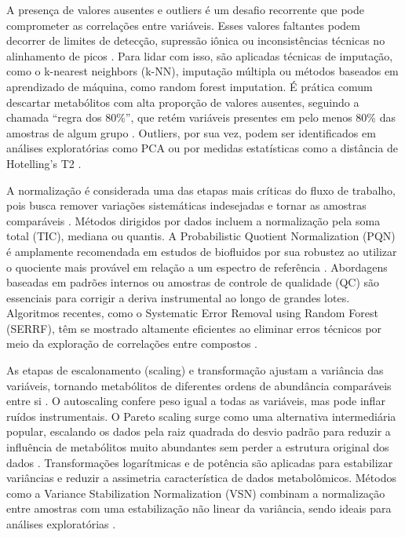 A presença de valores ausentes e outliers é um desafio recorrente que pode comprometer as correlações entre variáveis. Esses valores faltantes podem decorrer de limites de detecção, supressão iônica ou inconsistências técnicas no alinhamento de picos \cite{sun2024pretreating}. Para lidar com isso, são aplicadas técnicas de imputação, como o k-nearest neighbors (k-NN), imputação múltipla ou métodos baseados em aprendizado de máquina, como random forest imputation. É prática comum descartar metabólitos com alta proporção de valores ausentes, seguindo a chamada “regra dos 80\%”, que retém variáveis presentes em pelo menos 80\% das amostras de algum grupo \cite{sun2024pretreating}. Outliers, por sua vez, podem ser identificados em análises exploratórias como PCA ou por medidas estatísticas como a distância de Hotelling’s T2 \cite{schiffman2018data}.

A normalização é considerada uma das etapas mais críticas do fluxo de trabalho, pois busca remover variações sistemáticas indesejadas e tornar as amostras comparáveis \cite{sun2024pretreating}. Métodos dirigidos por dados incluem a normalização pela soma total (TIC), mediana ou quantis. A Probabilistic Quotient Normalization (PQN) é amplamente recomendada em estudos de biofluidos por sua robustez ao utilizar o quociente mais provável em relação a um espectro de referência \cite{picone2026integrating}. Abordagens baseadas em padrões internos ou amostras de controle de qualidade (QC) são essenciais para corrigir a deriva instrumental ao longo de grandes lotes. Algoritmos recentes, como o Systematic Error Removal using Random Forest (SERRF), têm se mostrado altamente eficientes ao eliminar erros técnicos por meio da exploração de correlações entre compostos \cite{datanor}.

As etapas de escalonamento (scaling) e transformação ajustam a variância das variáveis, tornando metabólitos de diferentes ordens de abundância comparáveis entre si \cite{sun2024pretreating}. O autoscaling confere peso igual a todas as variáveis, mas pode inflar ruídos instrumentais. O Pareto scaling surge como uma alternativa intermediária popular, escalando os dados pela raiz quadrada do desvio padrão para reduzir a influência de metabólitos muito abundantes sem perder a estrutura original dos dados \cite{mayonu2026evaluation}. Transformações logarítmicas e de potência são aplicadas para estabilizar variâncias e reduzir a assimetria característica de dados metabolômicos. Métodos como a Variance Stabilization Normalization (VSN) combinam a normalização entre amostras com uma estabilização não linear da variância, sendo ideais para análises exploratórias \cite{sun2024pretreating}.

